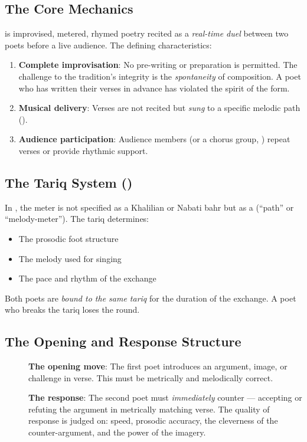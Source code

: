 \subsection{The Core Mechanics}

 is improvised, metered, rhymed poetry recited as a \textit{real-time duel} between two poets before a live audience. The defining characteristics:

\begin{enumerate}
  \item \textbf{Complete improvisation}: No pre-writing or preparation is permitted. The challenge to the tradition's integrity is the \textit{spontaneity} of composition. A poet who has written their verses in advance has violated the spirit of the form.
  \item \textbf{Musical delivery}: Verses are not recited but \textit{sung} to a specific melodic path ().
  \item \textbf{Audience participation}: Audience members (or a chorus group, ) repeat verses or provide rhythmic support.
\end{enumerate}

\subsection{The Tariq System ()}

In , the meter is not specified as a Khalilian or Nabati bahr but as a  (``path'' or ``melody-meter''). The tariq determines:
\begin{itemize}
  \item The prosodic foot structure
  \item The melody used for singing
  \item The pace and rhythm of the exchange
\end{itemize}

Both poets are \textit{bound to the same tariq} for the duration of the exchange. A poet who breaks the tariq loses the round.

\subsection{The Opening and Response Structure}

\begin{description}
  \item[] \textbf{The opening move}: The first poet introduces an argument, image, or challenge in verse. This must be metrically and melodically correct.
  \item[] \textbf{The response}: The second poet must \textit{immediately} counter — accepting or refuting the argument in metrically matching verse. The quality of response is judged on: speed, prosodic accuracy, the cleverness of the counter-argument, and the power of the imagery.
\end{description}

